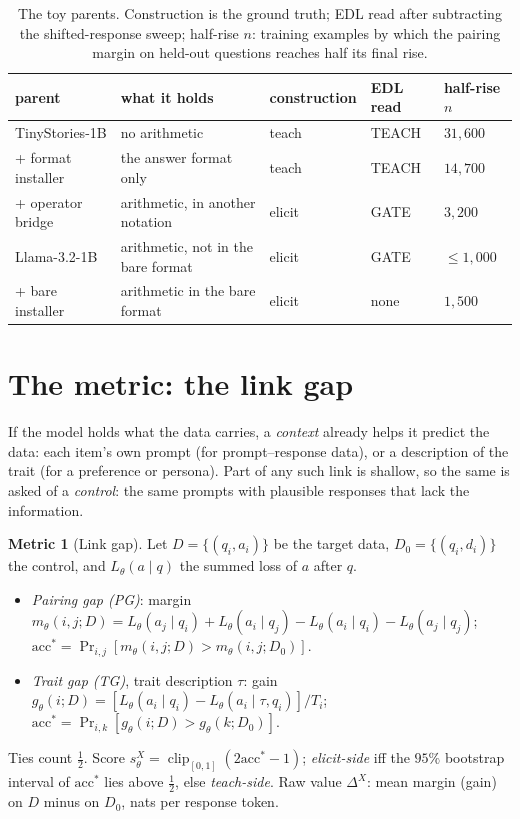 \documentclass[11pt]{article}
\newcommand{\acc}{\mathrm{acc}^*}
\theoremstyle{definition}
\newtheorem{metric}{Metric}
\DeclareMathOperator{\clip}{clip}
\begin{document}
\begin{table}[h]
\centering
\small
\begin{tabular}{lp{5.6cm}lll}
\toprule
parent & what it holds & construction & EDL read & half-rise $n$ \\
\midrule
TinyStories-1B & no arithmetic & teach & TEACH & $31{,}600$ \\
\quad + format installer & the answer format only & teach & TEACH & $14{,}700$ \\
\quad + operator bridge & arithmetic, in another notation & elicit & GATE & $3{,}200$ \\
Llama-3.2-1B & arithmetic, not in the bare format & elicit & GATE & $\le1{,}000$ \\
\quad + bare installer & arithmetic in the bare format & elicit & none & $1{,}500$ \\
\bottomrule
\end{tabular}
\caption{The toy parents. Construction is the ground truth; EDL read after subtracting the shifted-response sweep;
half-rise $n$: training examples by which the pairing margin on held-out questions reaches half its final rise.}
\label{tab:toy}
\end{table}

\section{The metric: the link gap}
\label{sec:metrics}

If the model holds what the data carries, a \emph{context} already helps it predict the data: each item's own prompt
(for prompt--response data), or a description of the trait (for a preference or persona). Part of any such link is
shallow, so the same is asked of a \emph{control}: the same prompts with plausible responses that lack the
information.

\begin{metric}[Link gap]\label{def:gap}\label{def:score}\label{def:call}\label{def:trait}
Let $D=\{(q_i,a_i)\}$ be the target data, $D_0=\{(q_i,d_i)\}$ the control, and $L_\theta(a\mid q)$ the summed loss of
$a$ after $q$.
\begin{itemize}[leftmargin=*,nosep]
\item \emph{Pairing gap (PG)}: margin $m_\theta(i,j;D)=L_\theta(a_j\mid q_i)+L_\theta(a_i\mid q_j)-L_\theta(a_i\mid
  q_i)-L_\theta(a_j\mid q_j)$; $\acc=\Pr_{i,j}[m_\theta(i,j;D)>m_\theta(i,j;D_0)]$.
\item \emph{Trait gap (TG)}, trait description $\tau$: gain $g_\theta(i;D)=[L_\theta(a_i\mid q_i)-L_\theta(a_i\mid
  \tau,q_i)]/T_i$; $\acc=\Pr_{i,k}[g_\theta(i;D)>g_\theta(k;D_0)]$.
\end{itemize}
Ties count $\tfrac12$. Score $s^X_\theta=\clip_{[0,1]}(2\acc-1)$; \emph{elicit-side} iff the $95\%$ bootstrap
interval of $\acc$ lies above $\tfrac12$, else \emph{teach-side}. Raw value $\Delta^X$: mean margin (gain) on $D$
minus on $D_0$, nats per response token.
\end{metric}
\end{document}
